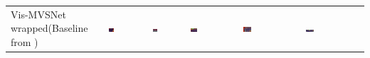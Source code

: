 \begin{longtable}{>{\tiny}M{25mm}M{26mm}M{26mm}M{26mm}M{26mm}M{26mm}}
            Vis-MVSNet wrapped\newline(Baseline from \cite{Zhang2020}) & \includegraphics[width=0.15\textwidth]{images/qualitatives/12_vismvsnbase/0000000-pred_depth_uncertainty.png} & \includegraphics[width=0.15\textwidth]{images/qualitatives/12_vismvsnbase/0000020-pred_depth_uncertainty.png} & \includegraphics[width=0.15\textwidth, trim={5cm 0 0 0},clip]{images/qualitatives/12_vismvsnbase/0000006-pred_depth_uncertainty.png} & \includegraphics[width=0.15\textwidth]{images/qualitatives/12_vismvsnbase/0000062-pred_depth_uncertainty.png} & \includegraphics[width=0.15\textwidth, trim={5cm 0 7.5cm 0},clip]{images/qualitatives/12_vismvsnbase/0000083-pred_depth_uncertainty.png}\\ 

\end{longtable}
